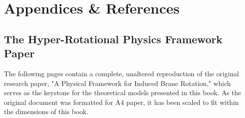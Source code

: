 \documentclass[11pt,twoside,openany]{book}
\begin{document}
\part{Appendices \& References}


\appendix
\chapter{The Hyper-Rotational Physics Framework Paper}

The following pages contain a complete, unaltered reproduction of the original research paper, "A Physical Framework for Induced Brane Rotation," which serves as the keystone for the theoretical models presented in this book. As the original document was formatted for A4 paper, it has been scaled to fit within the dimensions of this book.

\newpage




\backmatter

\printbibliography[heading=bibintoc,title={Bibliography}]





\end{document}
